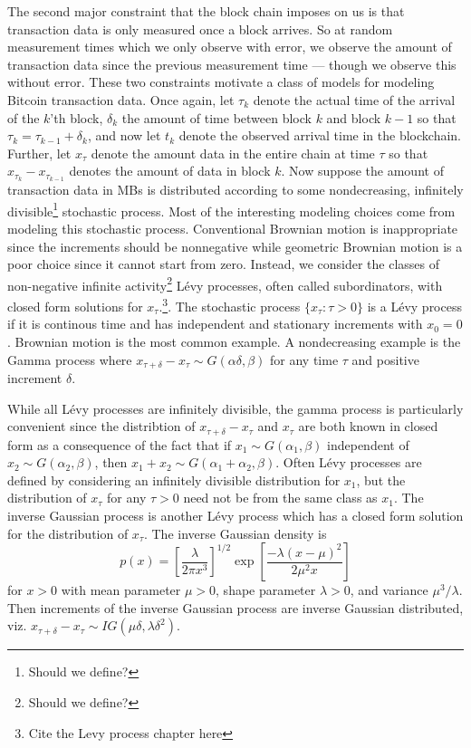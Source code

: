 \documentclass{article}
\begin{document}
The second major constraint that the block chain imposes on us is that transaction data is only measured once a block arrives. So at random measurement times which we only observe with error, we observe the amount of transaction data since the previous measurement time --- though we observe this without error. These two constraints motivate a class of models for modeling Bitcoin transaction data. Once again, let $\tau_k$ denote the actual time of the arrival of the $k$'th block, $\delta_k$ the amount of time between block $k$ and block $k-1$ so that $\tau_{k}=\tau_{k-1} + \delta_k$, and now let $t_k$ denote the observed arrival time in the blockchain. Further, let $x_\tau$ denote the amount data in the entire chain at time $\tau$ so that $x_{\tau_{k}} - x_{\tau_{k-1}}$ denotes the amount of data in block $k$. Now suppose the amount of transaction data in MBs is distributed according to some nondecreasing, infinitely divisible\footnote{Should we define?} stochastic process. Most of the interesting modeling choices come from modeling this stochastic process. Conventional Brownian motion is inappropriate since the increments should be nonnegative while geometric Brownian motion is a poor choice since it cannot start from zero. Instead, we consider the classes of non-negative infinite activity\footnote{Should we define?} L\'{e}vy processes, often called subordinators, with closed form solutions for $x_{\tau}$.\footnote{Cite the Levy process chapter here}. The stochastic process $\{x_{\tau}:\tau>0\}$ is a L\'{e}vy process if it is continous time and has independent and stationary increments with $x_0=0$. Brownian motion is the most common example. A nondecreasing example is the Gamma process where $x_{\tau + \delta} - x_{\tau} \sim G(\alpha \delta, \beta)$ for any time $\tau$ and positive increment $\delta$. 

While all L\'{e}vy processes are infinitely divisible, the gamma process is particularly convenient since the distribtion of $x_{\tau+\delta} - x_\tau$ and $x_\tau$ are both known in closed form as a consequence of the fact that if $x_1\sim G(\alpha_1,\beta)$ independent of $x_2\sim G(\alpha_2,\beta)$, then $x_1+x_2 \sim G(\alpha_1 + \alpha_2, \beta)$. Often L\'{e}vy processes are defined by considering an infinitely divisible distribution for $x_1$, but the distribution of $x_{\tau}$ for any $\tau>0$ need not be from the same class as $x_1$. The inverse Gaussian process is another L\'{e}vy process which has a closed form solution for the distribution of $x_\tau$. The inverse Gaussian density is
\[
p(x) = \left[\frac{\lambda}{2\pi x^3}\right]^{1/2}\exp\left[\frac{-\lambda(x - \mu)^2}{2\mu^2x}\right]
\]
for $x>0$ with mean parameter $\mu>0$, shape parameter $\lambda>0$, and variance $\mu^3/\lambda$. Then increments of the inverse Gaussian process are inverse Gaussian distributed, viz. $x_{\tau + \delta} - x_\tau \sim IG(\mu\delta,\lambda\delta^2)$.
\end{document}
